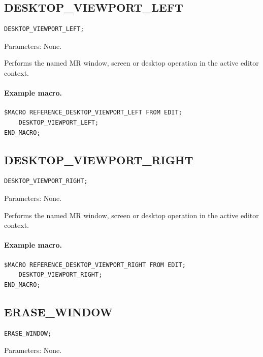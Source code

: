\documentclass[a4paper,10pt,twoside,openany]{book}
\newenvironment{mrmacextension}{\begin{changebar}}{\end{changebar}}
\begin{document}
\begin{mrmacextension}
\label{prim:procedure-desktop-viewport-left}
\subsection*{DESKTOP\_VIEWPORT\_LEFT}
\begin{verbatim}
DESKTOP_VIEWPORT_LEFT;
\end{verbatim}
Parameters: None.

Performs the named MR window, screen or desktop operation in the active editor context.

\paragraph{Example macro.}
\begin{verbatim}
$MACRO REFERENCE_DESKTOP_VIEWPORT_LEFT FROM EDIT;
    DESKTOP_VIEWPORT_LEFT;
END_MACRO;
\end{verbatim}
\end{mrmacextension}

\begin{mrmacextension}
\label{prim:procedure-desktop-viewport-right}
\subsection*{DESKTOP\_VIEWPORT\_RIGHT}
\begin{verbatim}
DESKTOP_VIEWPORT_RIGHT;
\end{verbatim}
Parameters: None.

Performs the named MR window, screen or desktop operation in the active editor context.

\paragraph{Example macro.}
\begin{verbatim}
$MACRO REFERENCE_DESKTOP_VIEWPORT_RIGHT FROM EDIT;
    DESKTOP_VIEWPORT_RIGHT;
END_MACRO;
\end{verbatim}
\end{mrmacextension}

\label{prim:procedure-erase-window}
\subsection*{ERASE\_WINDOW}
\begin{verbatim}
ERASE_WINDOW;
\end{verbatim}
Parameters: None.
\end{document}
